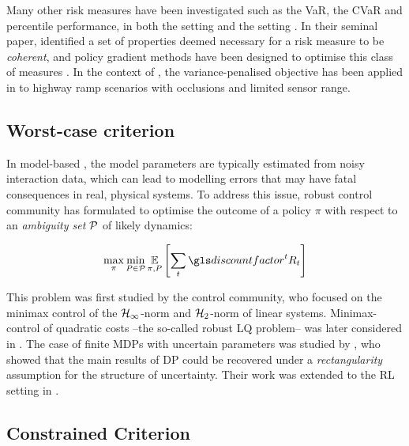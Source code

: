 Many other risk measures have been investigated such as the \gls{VaR}, the \gls{CVaR} and percentile performance, in both the  setting \citet{Torossian19a} and the  setting \citep{Moody2001,Tamar2012,Prashanth2013,Delage2010}. In their seminal paper, \citet{Artzner1999} identified a set of properties deemed necessary for a risk measure to be \emph{coherent}, and policy gradient methods have been designed to optimise this class of measures \citep{Tamar2015}.
In the context of , the variance-penalised objective has been applied in \eg \citep{Naghshvar2018} to highway ramp scenarios with occlusions and limited sensor range.

\subsection{Worst-case criterion}

In \gls{model-based} , the model parameters are typically estimated from noisy interaction data, which can lead to modelling errors that may have fatal consequences in real, physical systems. To address this issue, robust control community has formulated to optimise the outcome of a policy $\pi$ with respect to an \emph{ambiguity set} $\mathcal{P}$ of likely dynamics:

\begin{equation*}
\max_\pi \min_{P\in\cP} \expectedvalue_{\pi, P} \left[\sum_t \discount^t R_t\right]
\end{equation*}

This problem was first studied by the control community, who focused on the minimax control of the $\mathcal{H}_\infty$-norm \citep[][]{Basar1996} and $\mathcal{H}_2$-norm \citep{Berkenkamp2015} of linear systems. Minimax-control of quadratic costs --the so-called robust \gls{LQ} problem-- was later considered in \citep{abbasi-yadkori11a,Ibrahimi2013,Faradonbeh2017,Ouyang2017,abeille18a,Dean2017,Dean2018}.
The case of finite \glspl{MDP} with uncertain parameters was studied by \citet{Iyengar2005,Nilim2005,Wiesemann2013}, who showed that the main results of \gls{DP} could be recovered under a \emph{rectangularity} assumption for the structure of uncertainty. Their work was extended to the \gls{RL} setting in \citep{Tamar2014}.


\subsection{Constrained Criterion}
\label{sec:constrained-criterion}

